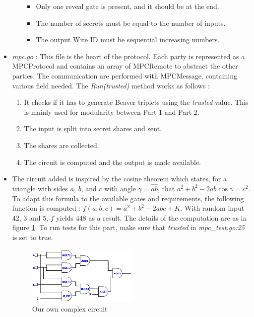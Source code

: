 \documentclass[10pt,conference]{IEEEtran}
\begin{document}
\begin{itemize}
\begin{itemize}
            \begin{itemize}
                \item Only one reveal gate is present, and it should be at the end.
                \item The number of secrets must be equal to the number of inputs.
                \item The output Wire ID must be sequential increasing numbers.
            \end{itemize}
        \end{itemize}
    \item \textit{mpc.go} : This file is the heart of the protocol. Each party is represented as a MPCProtocol and contains an array of MPCRemote to abstract the other parties. The communication are performed with MPCMessage, containing various field needed. The \textit{Run(trusted)} method works as follows :
        \begin{enumerate}
            \item It checks if it has to generate Beaver triplets using the \textit{trusted} value. This is mainly used for modularity between Part 1 and Part 2.
            \item The input is split into secret shares and sent.
            \item The shares are collected.
            \item The circuit is computed and the output is made available.
        \end{enumerate}
      \item The circuit added is inspired by the cosine theorem which states, for a triangle with sides $a$, $b$, and $c$ with angle $\gamma = \widehat{ab}$, that $a^2 + b^2 - 2ab\cos\gamma = c^2$. To adapt this formula to the available gates and requirements, the following function is computed : $f(a,b,c) = a^2 + b^2 - 2abc + K$. With random input $42$, $3$ and $5$, $f$ yields $448$ as a result. The details of the computation are as in figure \ref{fig:circ}. To run tests for this part, make sure that \textit{trusted} in \textit{mpc\_test.go:25} is set to true.
\begin{figure}[h]
  \caption{Our own complex circuit}
  \label{fig:circ}
  \includegraphics[width=0.5\textwidth]{main.png}
\end{figure}
\end{itemize}
\end{document}
